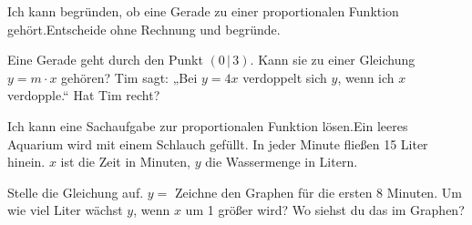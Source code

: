 \begin{aufgabe}{Ich kann begründen, ob eine Gerade zu einer proportionalen Funktion gehört.\newline Entscheide ohne Rechnung und begründe.}
\begin{teile}
\teil Eine Gerade geht durch den Punkt $(0 \,|\, 3)$. Kann sie zu einer Gleichung $y = m \cdot x$ gehören?
\teil Tim sagt: „Bei $y = 4x$ verdoppelt sich $y$, wenn ich $x$ verdopple.“ Hat Tim recht?
\end{teile}
\end{aufgabe}

\begin{aufgabe}{Ich kann eine Sachaufgabe zur proportionalen Funktion lösen.\newline Ein leeres Aquarium wird mit einem Schlauch gefüllt. In jeder Minute fließen 15 Liter hinein. $x$ ist die Zeit in Minuten, $y$ die Wassermenge in Litern.}
\begin{teile}
\teil Stelle die Gleichung auf. \quad $y = $ \leerfeld
\teil Zeichne den Graphen für die ersten 8 Minuten.
\teil Um wie viel Liter wächst $y$, wenn $x$ um 1 größer wird? Wo siehst du das im Graphen?
\end{teile}

\begin{ksys}[xmin=0,xmax=8,ymin=0,ymax=120,ystep=15,xlabel=$x$ in min,ylabel=$y$ in l]
\end{ksys}

\end{aufgabe}
